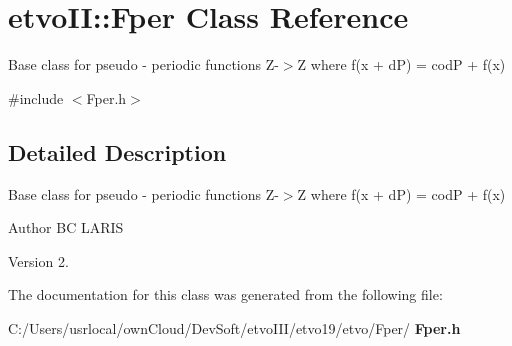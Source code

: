 \section{etvo\+II\+:\+:Fper Class Reference}
\label{classetvo_i_i_1_1_fper}


Base class for pseudo -\/ periodic functions Z-\/$>$Z where f(x + dP) = codP + f(x)  




{\ttfamily \#include $<$Fper.\+h$>$}



\subsection{Detailed Description}
Base class for pseudo -\/ periodic functions Z-\/$>$Z where f(x + dP) = codP + f(x) 

\begin{DoxyAuthor}{Author}
BC L\+A\+R\+IS 
\end{DoxyAuthor}
\begin{DoxyVersion}{Version}
2. 
\end{DoxyVersion}


The documentation for this class was generated from the following file\+:\begin{DoxyCompactItemize}
\item 
C\+:/\+Users/usrlocal/own\+Cloud/\+Dev\+Soft/etvo\+I\+I\+I/etvo19/etvo/\+Fper/\textbf{ Fper.\+h}\end{DoxyCompactItemize}
